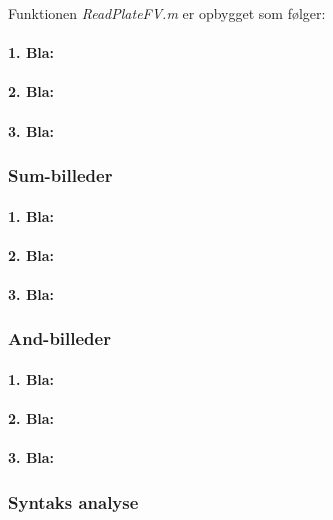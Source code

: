Funktionen \textit{ReadPlateFV.m} er opbygget som følger:

\paragraph{1. Bla:}

\paragraph{2. Bla:}

\paragraph{3. Bla:}

\subsubsection{Sum-billeder}

\paragraph{1. Bla:}

\paragraph{2. Bla:}

\paragraph{3. Bla:}

\subsubsection{And-billeder}

\paragraph{1. Bla:}

\paragraph{2. Bla:}

\paragraph{3. Bla:}

\subsubsection{Syntaks analyse}

